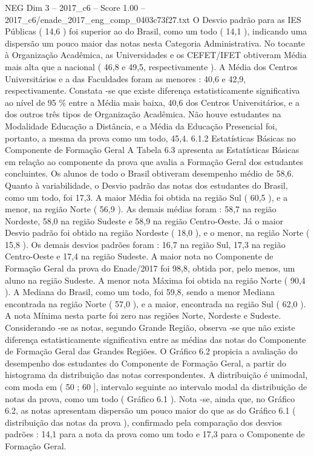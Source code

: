 \begin{textsample}{NEG Dim 3 – 2017\_c6 – Score 1.00 – 2017\_c6/enade\_2017\_eng\_comp\_0403c73f27.txt}
O Desvio padrão para as IES Públicas ( 14,6 ) foi superior ao do Brasil, como um todo ( 14,1 ), indicando uma dispersão um pouco maior das notas nesta Categoria Administrativa.
No tocante à Organização Acadêmica, as Universidades e os CEFET/IFET obtiveram Média mais alta que a nacional ( 46,8 e 49,5, respectivamente ).
A Média dos Centros Universitários e a das Faculdades foram as menores : 40,6 e 42,9, respectivamente.
Constata -se que existe diferença estatisticamente significativa ao nível de 95 \% entre a Média mais baixa, 40,6 dos Centros Universitários, e a dos outros três tipos de Organização Acadêmica.
Não houve estudantes na Modalidade Educação a Distância, e a Média da Educação Presencial foi, portanto, a mesma da prova como um todo, 45,4. 6.1.2 Estatísticas Básicas no Componente de Formação Geral A Tabela 6.3 apresenta as Estatísticas Básicas em relação ao componente da prova que avalia a Formação Geral dos estudantes concluintes.
Os alunos de todo o Brasil obtiveram desempenho médio de 58,6.
Quanto à variabilidade, o Desvio padrão das notas dos estudantes do Brasil, como um todo, foi 17,3.
A maior Média foi obtida na região Sul ( 60,5 ), e a menor, na região Norte ( 56,9 ).
As demais médias foram : 58,7 na região Nordeste, 58,0 na região Sudeste e 58,9 na região Centro-Oeste.
Já o maior Desvio padrão foi obtido na região Nordeste ( 18,0 ), e o menor, na região Norte ( 15,8 ).
Os demais desvios padrões foram : 16,7 na região Sul, 17,3 na região Centro-Oeste e 17,4 na região Sudeste.
A maior nota no Componente de Formação Geral da prova do Enade/2017 foi 98,8, obtida por, pelo menos, um aluno na região Sudeste.
A menor nota Máxima foi obtida na região Norte ( 90,4 ).
A Mediana do Brasil, como um todo, foi 59,8, sendo a menor Mediana encontrada na região Norte ( 57,0 ), e a maior, encontrada na região Sul ( 62,0 ).
A nota Mínima nesta parte foi zero nas regiões Norte, Nordeste e Sudeste.
Considerando -se as notas, segundo Grande Região, observa -se que não existe diferença estatisticamente significativa entre as médias das notas do Componente de Formação Geral das Grandes Regiões.
O Gráfico 6.2 propicia a avaliação do desempenho dos estudantes do Componente de Formação Geral, a partir do histograma da distribuição das notas correspondentes.
A distribuição é unimodal, com moda em ( 50 ; 60 ], intervalo seguinte ao intervalo modal da distribuição de notas da prova, como um todo ( Gráfico 6.1 ).
Nota -se, ainda que, no Gráfico 6.2, as notas apresentam dispersão um pouco maior do que as do Gráfico 6.1 ( distribuição das notas da prova ), confirmado pela comparação dos desvios padrões : 14,1 para a nota da prova como um todo e 17,3 para o Componente de Formação Geral.

\end{textsample}
